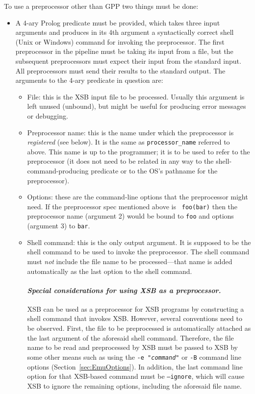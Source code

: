 \begin{description}
  To use a preprocessor other than GPP two things must be done:
  \begin{itemize}
  \item A 4-ary Prolog predicate must be provided, which takes three input
    arguments and produces in its 4th argument
    a syntactically correct shell (Unix or Windows)
    command for invoking the preprocessor. The first preprocessor in the
    pipeline 
    must be taking its input 
    from a file, but the subsequent preprocessors must expect their input from
    the standard input. All preprocessors must
    send their results to the standard
    output. The arguments to the 4-ary predicate in question are:
    \begin{itemize}
    \item   File: this is the XSB input file to be processed. Usually this
      argument is left unused (unbound), but might be useful for producing error
      messages or debugging.
    \item   Preprocessor name: this is the name under which the
      preprocessor is \emph{registered} (see below). It is the same as
      {\tt processor\_name} referred to above.  This name is  
      up to the programmer; it is
      to be used to refer to the preprocessor (it does not need to be
      related in any way to
      the shell-command-producing predicate or to the OS's pathname for the
      preprocessor).
    \item Options: these are the command-line options that the preprocessor
      might need. If the preprocessor spec mentioned above is {\tt
        foo(bar)} then the preprocessor name (argument 2) would be bound to
      {\tt foo} and options (argument 3) to {\tt bar}.
    \item Shell command: this is the only output argument. It is supposed
      to be the shell command to be used to invoke the preprocessor.
      The shell command must \emph{not} include the file name to be
      processed---that name is added automatically as the last option
      to the shell command.

      \paragraph{\it Special considerations for using XSB as a preprocessor.}
      XSB can be used as a preprocessor for XSB programs by
      constructing a shell command that invokes XSB. However, several
      conventions need to be observed. First, the file to be
      preprocessed is automatically attached as the last argument of
      the aforesaid shell command.  Therefore, the file name to be
      read and preprocessed by XSB must be passed to XSB by some other
      means such as using the \texttt{-e "\emph{command}"} or {\tt -B}
      command line options (Section~\ref{sec:EmuOptions}).  In
      addition, the last command line option for that XSB-based
      command must be \texttt{--ignore}, which will cause XSB to
      ignore the remaining options, including the aforesaid file name. 


\end{itemize}
\end{itemize}
\end{description}
